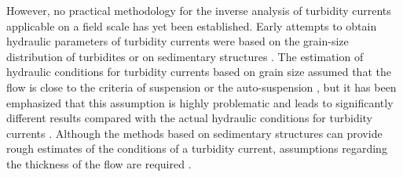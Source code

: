 However, no practical methodology for the inverse analysis of turbidity currents applicable on a field scale has yet been established. Early attempts to obtain hydraulic parameters of turbidity currents were based on the grain-size distribution of turbidites \citep{SCHEIDEGGER1965,vanTassell1981,Bowen1984,Komar1985,Kubo1995} or on sedimentary structures \citep{Harms1960,Walker1965,allen1982sedimentary,Komar1985,allen1991bouma,baas2000duration}. The estimation of hydraulic conditions for turbidity currents based on grain size assumed that the flow is close to the criteria of suspension or the auto-suspension \citep{Komar1985}, but it has been emphasized that this assumption is highly problematic and leads to significantly different results compared with the actual hydraulic conditions for turbidity currents \citep{Hiscott1994}. Although the methods based on sedimentary structures can provide rough estimates of the conditions of a turbidity current, assumptions regarding the thickness of the flow are required \citep{Ohata2017}. 

